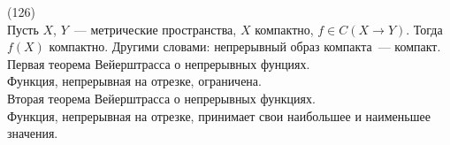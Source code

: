(126)\\
Пусть $X$, $Y$~--- метрические пространства, $X$ компактно, $f \in C(X \to Y)$. Тогда $f(X)$ компактно. Другими словами: непрерывный образ компакта~--- компакт.\\
\q Первая теорема Вейерштрасса о непрерывных фунциях.\\
Функция, непрерывная на отрезке, ограничена.\\
\q Вторая теорема Вейерштрасса о непрерывных функциях.\\
Функция, непрерывная на отрезке, принимает свои наибольшее и наименьшее значения.

